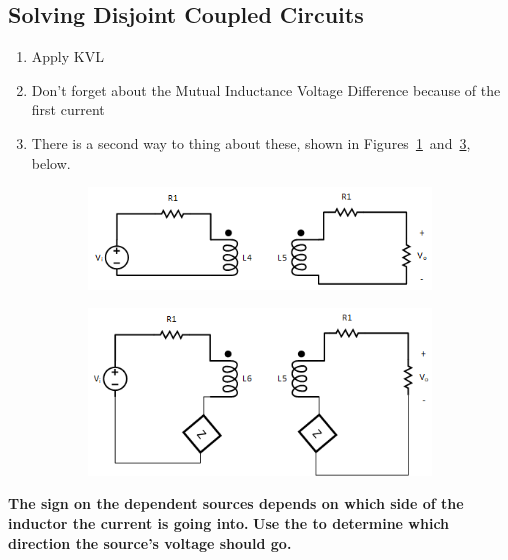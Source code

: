 \documentclass[10pt,letterpaper,final,twoside,notitlepage]{article}
\begin{document}
	\subsection*{Solving Disjoint Coupled Circuits} \label{subsec:Solve Disjoint Coupled Circuits}
		\begin{enumerate}[noitemsep] %
			\item Apply KVL
			\item Don't forget about the Mutual Inductance Voltage Difference because of the first current
			\item There is a second way to thing about these, shown in Figures~\ref{subfig:Disjoint Coupled Inductors OG}~and~\ref{subfig:Disjoint Coupled Inductors Simplified}, below.
		\end{enumerate}
		\begin{figure}[ht!] %
			\begin{subfigure}{0.5\textwidth}
				\centering
				\includegraphics[scale=0.35]{Disjoint_Coupled_Inductors-OG.png}
				\label{subfig:Disjoint Coupled Inductors OG}
			\end{subfigure}
			\begin{subfigure}{0.5\textwidth}
				\centering
				\includegraphics[scale=0.30]{Disjoint_Coupled_Inductors-Simplified.png}
				\label{subfig:Disjoint Coupled Inductors Simplified}
			\end{subfigure}
		\end{figure}
		\textbf{The sign on the dependent sources depends on which side of the inductor the current is going into.} \newline
		\textbf{Use the  to determine which direction the source's voltage should go.}
		
\end{document}
